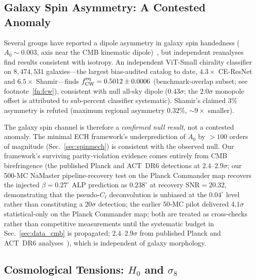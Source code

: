 \documentclass[aps,prd,twocolumn,superscriptaddress,showpacs,preprintnumbers,nofootinbib,longbibliography,floatfix]{revtex4-2}
\newcommand{\fcw}{f_{\rm CW}}
\begin{document}
\subsection{Galaxy Spin Asymmetry: A Contested Anomaly}\label{sec:spinobs}

Several groups have reported a dipole asymmetry in galaxy spin handedness ($A_0 \sim 0.003$, axis near the CMB kinematic dipole)~\cite{Shamir2012,Shamir2022,Longo2011}, but independent reanalyses~\cite{PatelDesmond2024,Philcox2025} find results consistent with isotropy. An independent ViT-Small chirality classifier on $8{,}474{,}531$ galaxies---the largest bias-audited catalog to date, $4.3\times$ CE-ResNet and $6.5\times$ Shamir---finds $\fcw^{\rm eq} = 0.5012 \pm 0.0006$ (benchmark-overlap subset; see footnote~\ref{fn:fcw}), consistent with null all-sky dipole ($0.43\sigma$; the $2.0\sigma$ monopole offset is attributed to sub-percent classifier systematic). Shamir's claimed $3\%$ asymmetry is refuted (maximum regional asymmetry $0.32\%$, ${\sim}9\times$ smaller).

The galaxy spin channel is therefore a \textit{confirmed null result}, not a contested anomaly. The minimal ECH framework's underprediction of $A_0$ by $>100$ orders of magnitude (Sec.~\ref{sec:spinmech}) is consistent with the observed null. Our framework's surviving parity-violation evidence comes entirely from CMB birefringence (the published Planck and ACT~DR6 detections at $2.4$--$2.9\sigma$; our 500-MC NaMaster pipeline-recovery test on the Planck Commander map recovers the injected $\beta=0.27^\circ$ ALP prediction as $0.238^\circ$ at recovery SNR$=20.32$, demonstrating that the pseudo-$C_\ell$ deconvolution is unbiased at the $0.04^\circ$ level rather than constituting a $20\sigma$ detection; the earlier 50-MC pilot delivered $4.1\sigma$ statistical-only on the Planck Commander map; both are treated as cross-checks rather than competitive measurements until the systematic budget in Sec.~\ref{sec:data_cmb} is propagated; $2.4$--$2.9\sigma$ from published Planck and ACT~DR6 analyses~\cite{Minami2020,Eskilt2022,DiegoPalazuelos2025}), which is independent of galaxy morphology.

\subsection{Cosmological Tensions: $H_0$ and $\sigma_8$}\label{sec:tensions}
\end{document}
